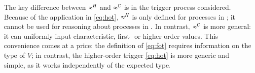 {\begin{remark}
The key difference between $\approx^H$ and $\approx^C$ is in the trigger process considered. 
Because of the application in \eqref{eq:hot}, $\approx^H$ is only defined for processes 
in \HO; it cannot be used for reasoning about processes in \sessp. In contrast, $\approx^C$ is more general:
it can uniformly input characteristic, first- or higher-order values.
This convenience comes at a price: the definition of \eqref{eq:fot} requires information on the 
type of $V$; in contrast, the higher-order trigger \eqref{eq:hot} is more generic and simple,
as it works independently of the expected type.
%
%
%
%
\end{remark}

}
